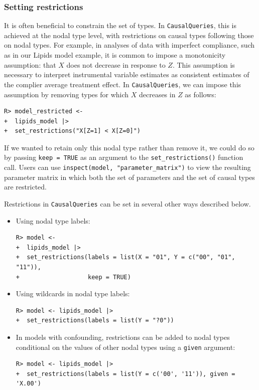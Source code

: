 \documentclass[
  11pt,
  article]{jss}
\begin{document}
\subsubsection{Setting restrictions}\label{restrictions}

It is often beneficial to constrain the set of types. In
\texttt{CausalQueries}, this is achieved at the nodal type level, with
restrictions on causal types following those on nodal types. For
example, in analyses of data with imperfect compliance, such as in our
Lipids model example, it is common to impose a monotonicity assumption:
that \(X\) does not decrease in response to \(Z\). This assumption is
necessary to interpret instrumental variable estimates as consistent
estimates of the complier average treatment effect. In
\texttt{CausalQueries}, we can impose this assumption by removing types
for which \(X\) decreases in \(Z\) as follows:

\begin{verbatim}
R> model_restricted <- 
+  lipids_model |> 
+  set_restrictions("X[Z=1] < X[Z=0]")
\end{verbatim}

If we wanted to retain only this nodal type rather than remove it, we
could do so by passing \texttt{keep\ =\ TRUE} as an argument to the
\texttt{set\_restrictions()} function call. Users can use
\texttt{inspect(model,\ "parameter\_matrix")} to view the resulting
parameter matrix in which both the set of parameters and the set of
causal types are restricted.

Restrictions in \texttt{CausalQueries} can be set in several other ways
described below.

\begin{itemize}
\item
  Using nodal type labels:

\begin{verbatim}
R> model <- 
+  lipids_model |>
+  set_restrictions(labels = list(X = "01", Y = c("00", "01", "11")), 
+                   keep = TRUE)
\end{verbatim}
\item
  Using wildcards in nodal type labels:

\begin{verbatim}
R> model <- lipids_model |>
+  set_restrictions(labels = list(Y = "?0"))
\end{verbatim}
\item
  In models with confounding, restrictions can be added to nodal types
  conditional on the values of other nodal types using a \texttt{given}
  argument:

\begin{verbatim}
R> model <- lipids_model |>
+  set_restrictions(labels = list(Y = c('00', '11')), given = 'X.00')
\end{verbatim}
\end{itemize}
\end{document}
